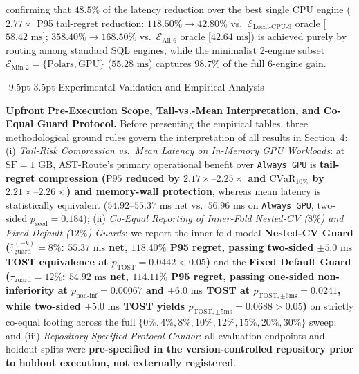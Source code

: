 \documentclass[10pt,a4paper]{article}
\makeatletter
\renewcommand\section{\@startsection{section}{1}{\z@}%
  {-9.5pt \@plus -2pt \@minus -1.5pt}%
  {3.5pt \@plus 1pt}%
  {\normalfont\large\bfseries}}
\makeatother
\begin{document}
\begin{enumerate}[leftmargin=1.5em,itemsep=0.8pt]
\begin{equation}
    \end{equation}
    confirming that $48.5\%$ of the latency reduction over the best single CPU engine ($2.77\times$ P95 tail-regret reduction: $118.50\% \rightarrow 42.80\%$ vs.\ $\mathcal{E}_{\text{Local-CPU-3}}$ oracle [$58.42\text{ ms}$]; $358.40\% \rightarrow 168.50\%$ vs.\ $\mathcal{E}_{\text{All-6}}$ oracle [$42.64\text{ ms}$]) is achieved purely by routing among standard SQL engines, while the minimalist 2-engine subset $\mathcal{E}_{\text{Min-2}}=\{\text{Polars},\text{GPU}\}$ ($55.28\text{ ms}$) captures $\mathbf{98.7\%}$ of the full 6-engine gain.
\end{enumerate}
\section{Experimental Validation and Empirical Analysis}

\par\vspace{3pt}\noindent\textbf{Upfront Pre-Execution Scope, Tail-vs.-Mean Interpretation, and Co-Equal Guard Protocol.} Before presenting the empirical tables, three methodological ground rules govern the interpretation of all results in Section~4: (i) \emph{Tail-Risk Compression vs.\ Mean Latency on In-Memory GPU Workloads}: at $\text{SF}=1\text{ GB}$, AST-Route's primary operational benefit over \texttt{Always GPU} is \textbf{tail-regret compression ($\text{P95}$ reduced by $2.17\times\text{--}2.25\times$ and $\text{CVaR}_{10\%}$ by $2.21\times\text{--}2.26\times$) and memory-wall protection}, whereas mean latency is statistically equivalent ($54.92\text{--}55.37\text{ ms}$ net vs.\ $56.96\text{ ms}$ on \texttt{Always GPU}, two-sided $p_{\text{seed}}=0.184$); (ii) \emph{Co-Equal Reporting of Inner-Fold Nested-CV ($8\%$) and Fixed Default ($12\%$) Guards}: we report the inner-fold modal \textbf{Nested-CV Guard ($\hat{\tau}_{\text{guard}}^{(-k)}=8\%$: $55.37\text{ ms}$ net, $118.40\%$ P95 regret, passing two-sided $\pm 5.0\text{ ms}$ TOST equivalence at $p_{\text{TOST}}=0.0442 < 0.05$)} and the \textbf{Fixed Default Guard ($\tau_{\text{guard}}=12\%$: $54.92\text{ ms}$ net, $114.11\%$ P95 regret, passing one-sided non-inferiority at $p_{\text{non-inf}}=0.00067$ and $\pm 6.0\text{ ms}$ TOST at $p_{\text{TOST},\pm 6\text{ms}}=0.0241$, while two-sided $\pm 5.0\text{ ms}$ TOST yields $p_{\text{TOST},\pm 5\text{ms}}=0.0688 > 0.05$)} on strictly co-equal footing across the full $\{0\%,4\%,8\%,10\%,12\%,15\%,20\%,30\%\}$ sweep; and (iii) \emph{Repository-Specified Protocol Candor}: all evaluation endpoints and holdout splits were \textbf{pre-specified in the version-controlled repository prior to holdout execution, not externally registered}.
\end{document}
